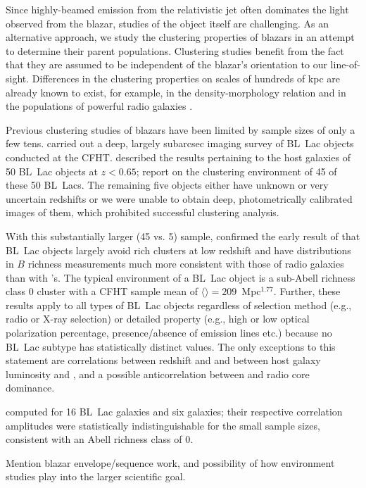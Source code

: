 \documentclass{emulateapj}
\begin{document}
Since highly-beamed emission from the relativistic jet often dominates the light observed from the blazar, studies of the object itself are challenging. As an alternative approach, we study the clustering properties of blazars in an attempt to determine their parent populations. Clustering studies benefit from the fact that they are assumed to be independent of the blazar's orientation to our line-of-sight. Differences in the clustering properties on scales of hundreds of kpc are already known to exist, for example, in the density-morphology relation \citep{dre80} and in the populations of powerful radio galaxies \citep{pre88}. 

Previous clustering studies of blazars have been limited by sample sizes of only a few tens. \citet{wur97} carried out a deep, largely subarcsec imaging survey of BL~Lac objects conducted at the CFHT. \citet{wur93} described the results pertaining to the host galaxies of 50 BL~Lac objects at $z<0.65$; \citet{wur97} report on the clustering environment of 45 of these 50 BL~Lacs. The remaining five objects either have unknown or very uncertain redshifts or we were unable to obtain deep, photometrically calibrated images of them, which prohibited successful clustering analysis.  

With this substantially larger (45 vs. 5) sample, \citet{wur97} confirmed the early result of \citet{pre88} that BL~Lac objects largely avoid rich clusters at low redshift and have distributions in $B$ richness measurements much more consistent with those of \FRII{} radio galaxies than with \FRI{}'s.  The typical environment of a BL~Lac object is a sub-Abell richness class 0 cluster with a CFHT sample mean of $\langle$\bgb$\rangle=209$~Mpc$^{1.77}$. Further, these results apply to all types of BL~Lac objects regardless of selection method (e.g., radio or X-ray selection) or detailed property (e.g., high or low optical polarization percentage, presence/absence of emission lines etc.) because no BL~Lac subtype has statistically distinct \bgb{} values. The only exceptions to this statement are correlations between redshift and \bgb{} and between host galaxy luminosity and \bgb, and a possible anticorrelation between \bgb{} and radio core dominance. 

\citet{smi95} computed \bgb{} for 16 BL~Lac galaxies and six \FRI{} galaxies; their respective correlation amplitudes were statistically indistinguishable for the small sample sizes, consistent with an Abell richness class of 0. 

Mention blazar envelope/sequence work, and possibility of how environment studies play into the larger scientific goal. 
\end{document}
